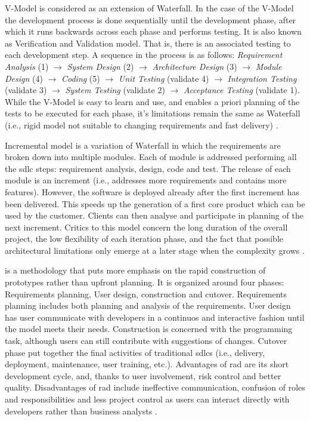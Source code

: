 V-Model \citep{ForsbergMooz1992} is considered as an extension of Waterfall. In the case of the V-Model the development process is done sequentially until the development phase, after which it runs backwards across each phase and performs testing. It is also known as Verification and Validation model. That is, there is an associated testing to each development step. A sequence in the process is as follows:  \textit{Requirement Analysis} (1) $\rightarrow$ \textit{System Design} (2) $\rightarrow$ \textit{Architecture Design} (3) $\rightarrow$ \textit{Module Design} (4) $\rightarrow$ \textit{Coding} (5) $\rightarrow$ \textit{Unit Testing} (validate  4) $\rightarrow$ \textit{Integration Testing} (validate 3) $\rightarrow$ \textit{System Testing} (validate 2) $\rightarrow$ \textit{Acceptance Testing} (validate 1). While the V-Model is easy to learn and use, and enables a priori planning of the tests to be executed for each phase, it's limitations remain the same as Waterfall (i.e., rigid model not suitable to changing requirements and fast delivery) \citep{marick1999new}.

Incremental model \citep{pressman2005software} is a variation of Waterfall in which the requirements are broken down into multiple modules. Each of module is addressed performing all the \gls{sdlc} steps: requirement analysis, design, code and test. The release of each module is an increment (i.e., addresses more requirements and contains more features). However, the software is deployed already after the first increment has been delivered. This speeds up the generation of a first core product which can be used by the customer. Clients can then analyse and participate in planning of the next increment. Critics to this model concern the long duration of the overall project, the low flexibility of each iteration phase, and the fact that possible architectural limitations only emerge at a later stage when the complexity grows \citep{mishra2013comparative}.

 \citep{martin1991rapid} is a methodology that puts more emphasis on the rapid construction of prototypes rather than upfront planning. It is organized around four phases: Requirements planning, User design, construction and cutover. Requirements planning includes both planning and analysis of the requirements. User design has user communicate with developers in a continuos and interactive fashion until the model meets their needs. Construction is concerned with the programming task, although users can still contribute with suggestions of changes. Cutover phase put together the final activities of traditional \glspl{sdlc} (i.e., delivery, deployment, maintenance, user training, etc.). Advantages of \gls{rad} are its short development cycle, and, thanks to user involvement, risk control and better quality.
Disadvantages of \gls{rad} include ineffective communication, confusion of roles and responsibilities and less project control as users can interact directly with developers rather than business analysts \citep{gerber2007practical}.

